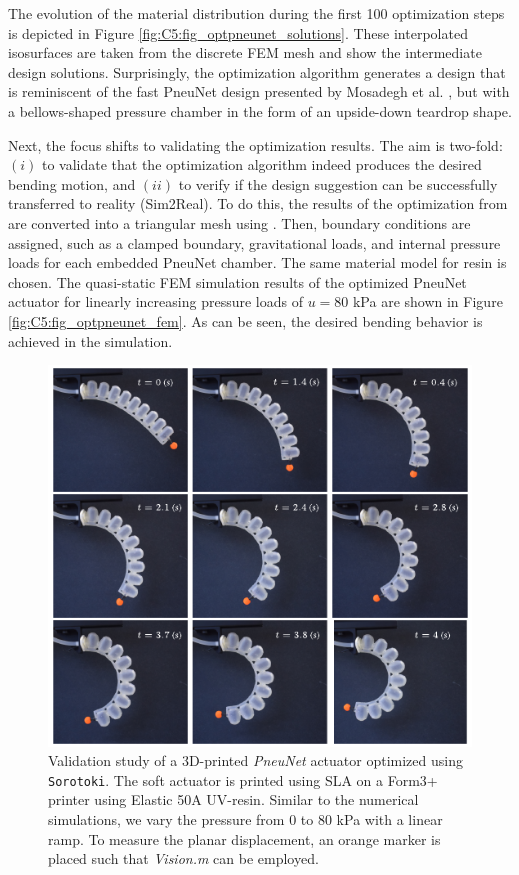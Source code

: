 The evolution of the material distribution during the first 100 optimization steps is depicted in Figure \ref{fig:C5:fig_optpneunet_solutions}. These interpolated isosurfaces are taken from the discrete FEM mesh and show the intermediate design solutions. Surprisingly, the optimization algorithm generates a design that is reminiscent of the fast PneuNet design presented by Mosadegh et al. \cite{Mosadegh2014}, but with a bellows-shaped pressure chamber in the form of an upside-down teardrop shape.

Next, the focus shifts to validating the optimization results. The aim is two-fold: $(i)$ to validate that the optimization algorithm indeed produces the desired bending motion, and $(ii)$ to verify if the design suggestion can be successfully transferred to reality (Sim2Real). To do this, the results of the optimization from  are converted into a triangular mesh using . Then, boundary conditions are assigned, such as a clamped boundary, gravitational loads, and internal pressure loads for each embedded PneuNet chamber. The same material model for  resin is chosen. The quasi-static FEM simulation results of the optimized PneuNet actuator for linearly increasing pressure loads of $u = 80$ \si{\kilo \pascal} are shown in Figure \ref{fig:C5:fig_optpneunet_fem}. As can be seen, the desired bending behavior is achieved in the simulation.

\begin{figure}[!t]
    \centering
    \includegraphics*[width=.825\textwidth]{./pdf/thesis-figure-6-24.pdf}
    \caption{\small Validation study of a 3D-printed \textit{PneuNet} actuator optimized using \texttt{Sorotoki}. The soft actuator is printed using SLA on a Form3+ printer using Elastic 50A UV-resin. Similar to the numerical simulations, we vary the pressure from 0 to 80 \si{\kilo \pascal} with a linear ramp. To measure the planar displacement, an orange marker is placed such that \textit{Vision.m} can be employed.}
    \label{fig:C5:fig_optpneunet_exp}
\end{figure}

